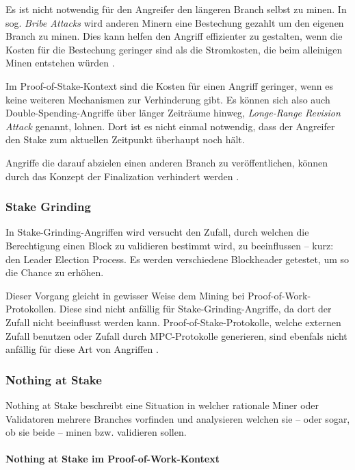 Es ist nicht notwendig für den Angreifer den längeren Branch selbst zu minen. In sog. \textit{Bribe Attacks} wird anderen Minern eine Bestechung gezahlt um den eigenen Branch zu minen. Dies kann helfen den Angriff effizienter zu gestalten, wenn die Kosten für die Bestechung geringer sind als die Stromkosten, die beim alleinigen Minen entstehen würden \cite[S. 3]{cwo_pow}.

Im Proof-of-Stake-Kontext sind die Kosten für einen Angriff geringer, wenn es keine weiteren Mechanismen zur Verhinderung gibt. 
Es können sich also auch Double-Spending-Angriffe über länger Zeiträume hinweg, \textit{Longe-Range Revision Attack} genannt, lohnen. Dort ist es nicht einmal notwendig, dass der Angreifer den Stake zum aktuellen Zeitpunkt überhaupt noch hält.

Angriffe die darauf abzielen einen anderen Branch zu veröffentlichen, können durch das Konzept der Finalization verhindert werden \cite[S. 5]{casper_ffg}.

\subsubsection{Stake Grinding}
\label{subsec:grinding}

In Stake-Grinding-Angriffen wird versucht den Zufall, durch welchen die Berechtigung einen Block zu validieren bestimmt wird, zu beeinflussen -- kurz: den Leader Election Process.
Es werden verschiedene Blockheader getestet, um so die Chance zu erhöhen. 

Dieser Vorgang gleicht in gewisser Weise dem Mining bei Proof-of-Work-Protokollen.
Diese sind nicht anfällig für Stake-Grinding-Angriffe, da dort der Zufall nicht beeinflusst werden kann.
Proof-of-Stake-Protokolle, welche externen Zufall benutzen oder Zufall durch MPC-Protokolle generieren, sind ebenfals nicht anfällig für diese Art von Angriffen \cite[S. 46]{ouroboros}.

\subsubsection{Nothing at Stake}
\label{subsec:nothing_stake}

Nothing at Stake beschreibt eine Situation in welcher rationale Miner oder Validatoren mehrere Branches vorfinden und analysieren welchen sie -- oder sogar, ob sie beide -- minen bzw. validieren sollen.

\paragraph{Nothing at Stake im Proof-of-Work-Kontext}

